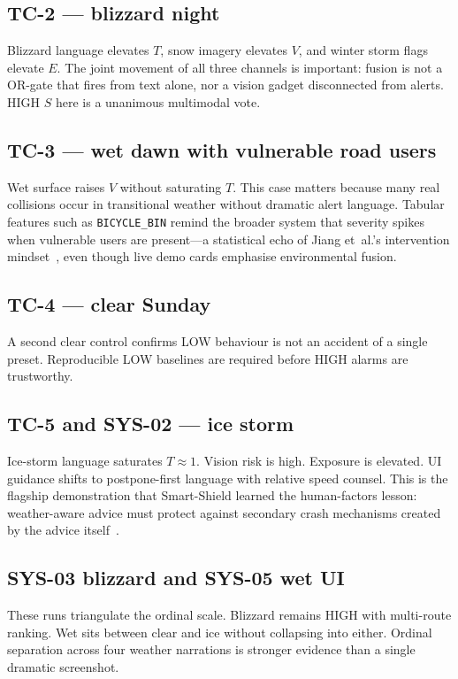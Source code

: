 \documentclass[11pt,a4paper]{article}
\begin{document}
\subsection{TC-2 --- blizzard night}
Blizzard language elevates $T$, snow imagery elevates $V$, and winter storm flags elevate $E$. The joint movement of all three channels is important: fusion is not a OR-gate that fires from text alone, nor a vision gadget disconnected from alerts. HIGH $S$ here is a unanimous multimodal vote.

\subsection{TC-3 --- wet dawn with vulnerable road users}
Wet surface raises $V$ without saturating $T$. This case matters because many real collisions occur in transitional weather without dramatic alert language. Tabular features such as \texttt{BICYCLE\_BIN} remind the broader system that severity spikes when vulnerable users are present---a statistical echo of Jiang et~al.'s intervention mindset~\citep{jiang2024traffic}, even though live demo cards emphasise environmental fusion.

\subsection{TC-4 --- clear Sunday}
A second clear control confirms LOW behaviour is not an accident of a single preset. Reproducible LOW baselines are required before HIGH alarms are trustworthy.

\subsection{TC-5 and SYS-02 --- ice storm}
Ice-storm language saturates $T\approx1$. Vision risk is high. Exposure is elevated. UI guidance shifts to postpone-first language with relative speed counsel. This is the flagship demonstration that Smart-Shield learned the human-factors lesson: weather-aware advice must protect against secondary crash mechanisms created by the advice itself~\citep{ahmad2022speed,pennino2024weather}.

\subsection{SYS-03 blizzard and SYS-05 wet UI}
These runs triangulate the ordinal scale. Blizzard remains HIGH with multi-route ranking. Wet sits between clear and ice without collapsing into either. Ordinal separation across four weather narrations is stronger evidence than a single dramatic screenshot.
\end{document}
